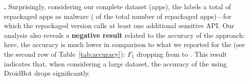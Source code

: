 \begin{table}[htb]
  \caption{Accuracy of the \mas in both datasets.}
  \label{tab:accuracy}
\end{table}







{\bf \cds.} Surprisingly, considering our complete dataset (\apps apps), the \mas
labels a total of  repackaged apps as malware ( of the total number of repackaged
apps)---for which the repackaged version calls at least one additional sensitive API.
Our analysis also reveals a {\bf negative result} related to the accuracy of the approach: here,
the accuracy is much lower in comparison to what we reported for the
\sds (see the second row of Table~\ref{tab:accuracy}): $F_1$ dropping from \fscoreSmall to \fscore.
This result indicates that, when considering a large dataset, the accuracy of the \mas using
DroidBot drops significantly.


